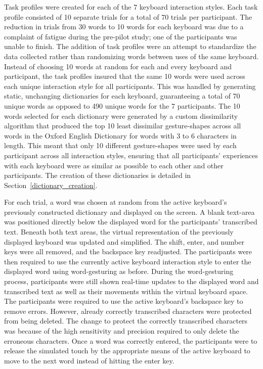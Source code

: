Task profiles were created for each of the 7 keyboard interaction styles. Each task profile consisted of 10 separate trials for a total of 70 trials per participant. The reduction in trials from 30 words to 10 words for each keyboard was due to a complaint of fatigue during the pre-pilot study; one of the participants was unable to finish. The addition of task profiles were an attempt to standardize the data collected rather than randomizing words between uses of the same keyboard. Instead of choosing 10 words at random for each and every keyboard and participant, the task profiles insured that the same 10 words were used across each unique interaction style for all participants. This was handled by generating static, unchanging dictionaries for each keyboard, guaranteeing a total of 70 unique words as opposed to 490 unique words for the 7 participants. The 10 words selected for each dictionary were generated by a custom dissimilarity algorithm that produced the top 10 least dissimilar gesture-shapes across all words in the Oxford English Dictionary for words with 3 to 6 characters in length. This meant that only 10 different gesture-shapes were used by each participant across all interaction styles, ensuring that all participants' experiences with each keyboard were as similar as possible to each other and other participants. The creation of these dictionaries is detailed in Section~\ref{dictionary_creation}.

For each trial, a word was chosen at random from the active keyboard's previously constructed dictionary and displayed on the screen. A blank text-area was positioned directly below the displayed word for the participants' transcribed text. Beneath both text areas, the virtual representation of the previously displayed keyboard was updated and simplified. The shift, enter, and number keys were all removed, and the backspace key readjusted. The participants were then required to use the currently active keyboard interaction style to enter the displayed word using word-gesturing as before. During the word-gesturing process, participants were still shown real-time updates to the displayed word and transcribed text as well as their movements within the virtual keyboard space. The participants were required to use the active keyboard's backspace key to remove errors. However, already correctly transcribed characters were protected from being deleted. The change to protect the correctly transcribed characters was because of the high sensitivity and precision required to only delete the erroneous characters. Once a word was correctly entered, the participants were to release the simulated touch by the appropriate means of the active keyboard to move to the next word instead of hitting the enter key.

